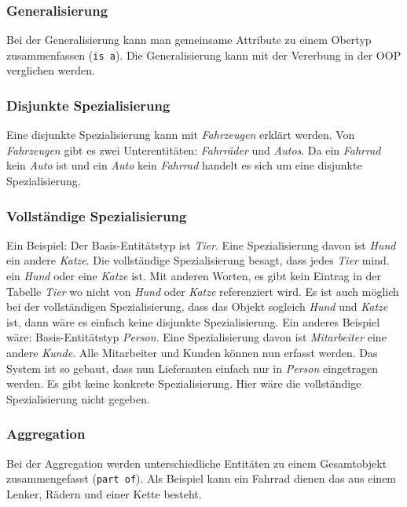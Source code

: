 \subsubsection{Generalisierung}

Bei der Generalisierung kann man gemeinsame Attribute zu einem Obertyp zusammenfassen (\texttt{is a}). Die Generalisierung kann mit der Vererbung in der OOP verglichen werden.

\subsubsection{Disjunkte Spezialisierung}

Eine disjunkte Spezialisierung kann mit \emph{Fahrzeugen} erklärt werden. Von \emph{Fahrzeugen} gibt es zwei Unterentitäten: \emph{Fahrräder} und \emph{Autos}. Da ein \emph{Fahrrad} kein \emph{Auto} ist und ein \emph{Auto} kein \emph{Fahrrad} handelt es sich um eine disjunkte Spezialisierung.

\subsubsection{Vollständige Spezialisierung}

Ein Beispiel: Der Basis-Entitätstyp ist \emph{Tier}. Eine Spezialisierung davon ist \emph{Hund} ein andere \emph{Katze}. Die vollständige Spezialisierung besagt, dass jedes \emph{Tier} mind. ein \emph{Hund} oder eine \emph{Katze} ist. Mit anderen Worten, es gibt kein Eintrag in der Tabelle \emph{Tier} wo nicht von \emph{Hund} oder \emph{Katze} referenziert wird. Es ist auch möglich bei der vollständigen Spezialisierung, dass das Objekt sogleich \emph{Hund} und \emph{Katze} ist, dann wäre es einfach keine disjunkte Spezialisierung.
Ein anderes Beispiel wäre: Basis-Entitätstyp \emph{Person}. Eine Spezialisierung davon ist \emph{Mitarbeiter} eine andere \emph{Kunde}. Alle Mitarbeiter und Kunden können nun erfasst werden. Das System ist so gebaut, dass nun Lieferanten einfach nur in \emph{Person} eingetragen werden. Es gibt keine konkrete Spezialisierung. Hier wäre die vollständige Spezialisierung nicht gegeben.

\subsubsection{Aggregation}

Bei der Aggregation werden unterschiedliche Entitäten zu einem Gesamtobjekt zusammengefasst (\texttt{part of}). Als Beispiel kann ein Fahrrad dienen das aus einem Lenker, Rädern und einer Kette besteht.
